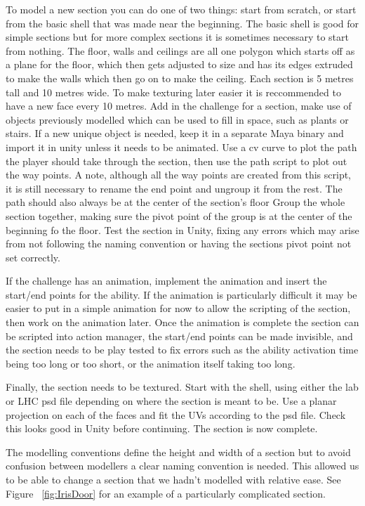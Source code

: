 \documentclass[a4paper,oneside]{memoir}
\begin{document}
			To model a new section you can do one of two things: start from scratch, or start from the basic shell that was made near the beginning. 
			The basic shell is good for simple sections but for more complex sections it is sometimes necessary to start from nothing.
			The floor, walls and ceilings are all one polygon which starts off as a plane for the floor, which then gets adjusted to size and has its edges extruded to make the walls which then go on to make the ceiling. Each section is 5 metres tall and 10 metres wide. To make texturing later easier it is reccommended to have a new face every 10 metres. 
			Add in the challenge for a section, make use of objects previously modelled which can be used to fill in space, such as plants or stairs.
			If a new unique object is needed, keep it in a separate Maya binary and import it in unity unless it needs to be animated.
			Use a cv curve to plot the path the player should take through the section, then use the path script to plot out the way points. A note, although all the way points are created from this script, it is still necessary to rename the end point and ungroup it from the rest. The path should also always be at the center of the section's floor
			Group the whole section together, making sure the pivot point of the group is at the center of the beginning fo the floor.
			Test the section in Unity, fixing any errors which may arise from not following the naming convention or having the sections pivot point not set correctly.

			If the challenge has an animation, implement the animation and insert the start/end points for the ability.
			If the animation is particularly difficult it may be easier to put in a simple animation for now to allow the scripting of the section, then work on the animation later.
			Once the animation is complete the section can be scripted into action manager, the start/end points can be made invisible, and the section needs to be play tested to fix errors such as the ability activation time being too long or too short, or the animation itself taking too long.

			Finally, the section needs to be textured. Start with the shell, using either the lab or LHC psd file depending on where the section is meant to be.
			Use a planar projection on each of the faces and fit the UVs according to the psd file. Check this looks good in Unity before continuing.
			The section is now complete.

			The modelling conventions define the height and width of a section but to avoid confusion between modellers a clear naming convention is needed. This allowed us to be able to change a section that we hadn't modelled with relative ease. See Figure ~\ref{fig:IrisDoor} for an example of a particularly complicated section.
\end{document}
